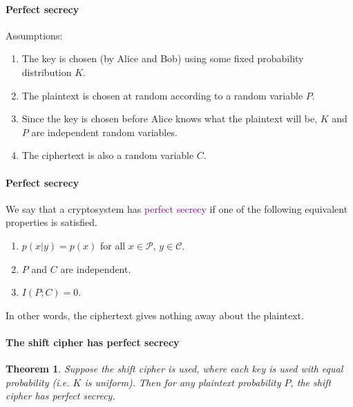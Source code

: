 \documentclass[a4paper, 11pt, openany]{book}
\numberwithin{equation}{section}
\theoremstyle{plain}
\newtheorem{theorem}	[equation]	{Theorem}
\theoremstyle{definition}
\newcommand{\Define}[1]{\textcolor{purple}{#1}}
\newcommand{\alphabet}[1]{\mathcal{#1}}
\begin{document}
\paragraph{Perfect secrecy}
Assumptions:
\begin{enumerate}
	\item The key is chosen (by Alice and Bob) using some fixed probability distribution $K$.

	\item The plaintext is chosen at random according to a random variable $P$.
	
	\item Since the key is chosen before Alice knows what the plaintext will be, $K$ and $P$ are independent random variables.
	
	\item The ciphertext is also a random variable $C$.
\end{enumerate}






\paragraph{Perfect secrecy}

We say that a cryptosystem has \Define{perfect secrecy} if one of the following equivalent properties is satisfied.
\begin{enumerate}
	\item $p(x | y) = p(x)$ for all $x \in \alphabet{P}$, $y \in \alphabet{C}$.
	
	\item $P$ and $C$ are independent.
	
	\item $I(P;C) = 0$.
\end{enumerate}

In other words, the ciphertext gives nothing away about the plaintext.




\paragraph{The shift cipher has perfect secrecy}
\begin{theorem}
Suppose the shift cipher is used, where each key is used with equal probability (i.e. $K$ is uniform). Then for any plaintext probability $P$, the shift cipher has perfect secrecy.
\end{theorem}
\end{document}
